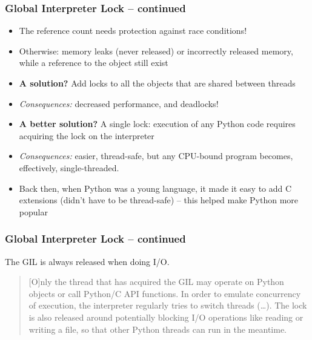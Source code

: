 \documentclass{beamer}
\begin{document}
    \begin{frame}
        \frametitle{Global Interpreter Lock -- continued}
        \begin{itemize}
            \item The reference count needs protection against race conditions!
            \item Otherwise: memory leaks (never released) or incorrectly released memory,
            while a reference to the object still exist
            \item \textbf{A solution?} Add locks to all the objects that are shared between threads
            \item \emph{Consequences:} decreased performance, and deadlocks!
            \item \textbf{A better solution?} A single lock: execution of any Python code
            requires acquiring the lock on the interpreter
            \item \emph{Consequences:} easier, thread-safe, but any CPU-bound program becomes, effectively, single-threaded.
            \item Back then, when Python was a young language, it made it easy to add C extensions
            (didn't have to be thread-safe) -- this helped make Python more popular
        \end{itemize}

    \end{frame}

    \begin{frame}
        \frametitle{Global Interpreter Lock -- continued}


        The GIL is always released when doing I/O.

        \begin{quotation}
            [O]nly the thread that has acquired the GIL may operate on Python objects or
            call Python/C API functions. In order to emulate concurrency of execution,
            the interpreter regularly tries to switch threads (\dots).
            The lock is also released around potentially blocking I/O operations like
            reading or writing a file, so that other Python threads can run in the meantime.
        \end{quotation}

    \end{frame}
\end{document}
